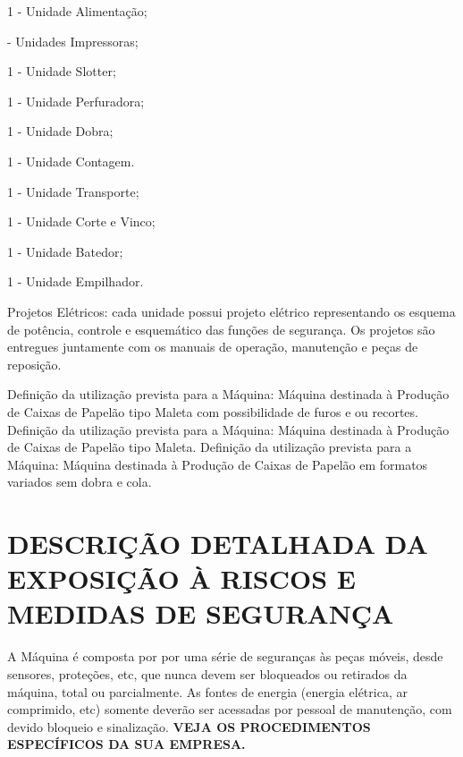 \begin{machinePartsList}
    \item[\ding{\dingNumber}] 1 - Unidade Alimentação;
    \item[\ding{\dingNumber}] \numberOfPrinters \space - Unidades Impressoras;
    \ifmachineType
        \item[\ding{\dingNumber}] 1 - Unidade Slotter;
        \ifunidadePerfuradora
        \item[\ding{\dingNumber}] 1 - Unidade Perfuradora;
        \fi
        \item[\ding{\dingNumber}] 1 - Unidade Dobra;
        \item[\ding{\dingNumber}] 1 - Unidade Contagem.
    \else
        \item[\ding{\dingNumber}] 1 - Unidade Transporte;
        \item[\ding{\dingNumber}] 1 - Unidade Corte e Vinco;
        \item[\ding{\dingNumber}] 1 - Unidade Batedor;
        \item[\ding{\dingNumber}] 1 - Unidade Empilhador.
    \fi
\end{machinePartsList}

Projetos Elétricos: cada unidade possui projeto elétrico representando os esquema de potência, controle e esquemático das
 funções de segurança. Os projetos são entregues juntamente com os manuais de operação, manutenção e
 peças de reposição.

 \ifmachineType

  \ifunidadePerfuradora
       Definição da utilização prevista para a Máquina:
 Máquina destinada à Produção de Caixas de Papelão tipo Maleta com possibilidade de furos e ou recortes.
 \else
 Definição da utilização prevista para a Máquina:
 Máquina destinada à Produção de Caixas de Papelão tipo Maleta.
    \fi
\else
Definição da utilização prevista para a Máquina:
Máquina destinada à Produção de Caixas de Papelão em formatos variados sem dobra e cola.
\fi

\newpage

\thispagestyle{fancy}

\vspace*{40 pt}

\section{\large{\MakeUppercase{Descrição detalhada da Exposição à Riscos e Medidas de Segurança}}}

A Máquina é composta por por uma série de seguranças às peças móveis, desde sensores, proteções, etc, que nunca devem
ser bloqueados ou retirados da máquina, total ou parcialmente. As fontes de energia (energia elétrica, ar comprimido, etc)
somente deverão ser acessadas por pessoal de manutenção, com devido bloqueio e sinalização.
\textbf{VEJA OS PROCEDIMENTOS ESPECÍFICOS DA SUA EMPRESA.}

